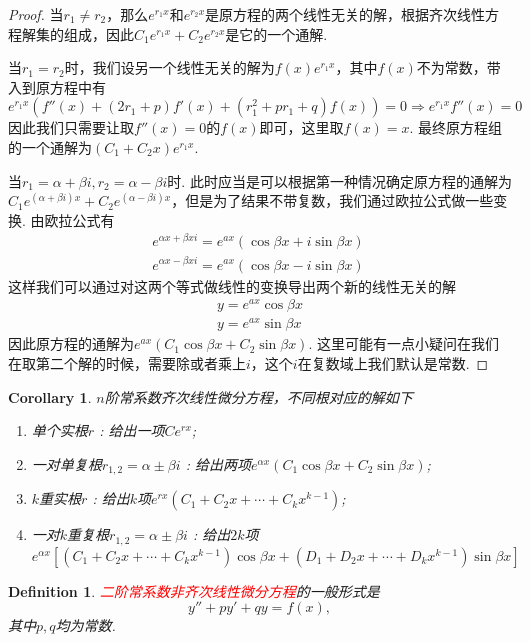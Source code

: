 \documentclass{article}
\newtheorem{corollary}[theorem]{Corollary}
\newtheorem{definition}[theorem]{Definition}
\newcommand{\redt}[1]{\textcolor{red}{#1}}
\begin{document}
\begin{proof}
\rm 当$r_1 \neq r_2$，那么$e^{r_1x}$和$e^{r_2x}$是原方程的两个线性无关的解，根据齐次线性方程解集的组成，因此$C_1e^{r_1x}+C_2e^{r_2x}$是它的一个通解. 

当$r_1 = r_2$时，我们设另一个线性无关的解为$f(x)e^{r_1x}$，其中$f(x)$不为常数，带入到原方程中有
$$
e^{r_1x}(f''(x) + (2r_1+p)f'(x) + (r_1^2 + pr_1 + q)f(x)) = 0 \Rightarrow e^{r_1x}f''(x) = 0
$$
因此我们只需要让取$f''(x) = 0$的$f(x)$即可，这里取$f(x)=x$. 最终原方程组的一个通解为$(C_1 +C_2x)e^{r_1x}$. 

当$r_1 = \alpha+\beta i, r_2 = \alpha - \beta i$时. 此时应当是可以根据第一种情况确定原方程的通解为$C_1e^{(\alpha+\beta i)x} + C_2e^{(\alpha - \beta i)x}$，但是为了结果不带复数，我们通过欧拉公式做一些变换. 由欧拉公式有
$$
\begin{array}{ll}
e^{\alpha x+\beta xi} = e^{ax}(\cos \beta x + i\sin \beta x)\\
e^{\alpha x-\beta xi} = e^{ax}(\cos \beta x - i\sin \beta x)\
\end{array}
$$
这样我们可以通过对这两个等式做线性的变换导出两个新的线性无关的解
$$
\begin{array}{ll}
y = e^{ax}\cos \beta x \\
y = e^{ax}\sin \beta x
\end{array}
$$
因此原方程的通解为$e^{ax}(C_1\cos \beta x +C_2 \sin \beta x)$. 这里可能有一点小疑问在我们在取第二个解的时候，需要除或者乘上$i$，这个$i$在复数域上我们默认是常数. 
\end{proof}

\begin{corollary}
\rm $n$阶常系数齐次线性微分方程，不同根对应的解如下
\begin{enumerate}
	\item 单个实根$r$ : 给出一项$Ce^{rx}$;
	\item 一对单复根$r_{1,2} = \alpha \pm \beta i$ : 给出两项$e^{\alpha x}(C_1\cos \beta x + C_2\sin \beta x)$;
	\item $k$重实根$r$ : 给出$k$项$e^{rx}(C_1 + C_2x + \cdots + C_kx^{k-1})$;
	\item 一对$k$重复根$r_{1,2} = \alpha \pm \beta i$ : 给出$2k$项$e^{\alpha x}[(C_1+C_2x +\cdots +C_kx^{k-1})\cos \beta x + (D_1+D_2x +\cdots +D_kx^{k-1})\sin \beta x]$
\end{enumerate}
\end{corollary}

\begin{definition}
\rm \redt{二阶常系数非齐次线性微分方程}的一般形式是
$$
y''+py' +qy = f(x),
$$
其中$p,q$均为常数. 
\end{definition}
\end{document}
